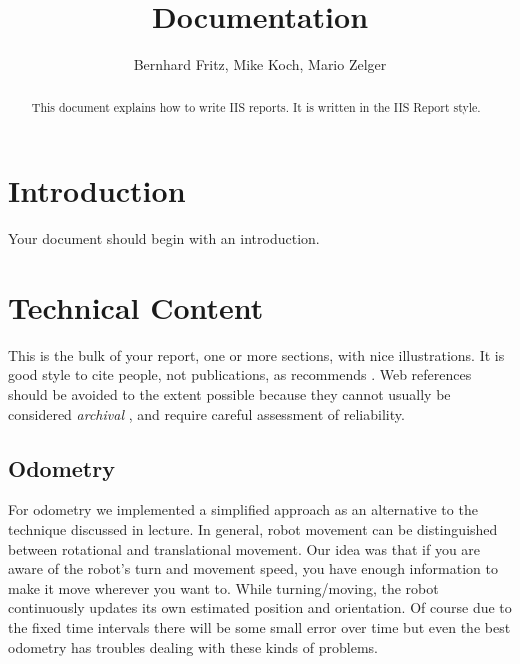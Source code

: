 \documentclass[703030]{iisreport}
\title{Documentation}
\author{Bernhard Fritz, Mike Koch, Mario Zelger}
\begin{document}
\maketitle

\begin{abstract}
  This document explains how to write IIS reports. It is written in the IIS Report style.
\end{abstract}

\section{Introduction}

Your document should begin with an introduction.

\section{Technical Content}

This is the bulk of your report, one or more sections, with nice illustrations. It is good style to cite people, not publications, as recommends \cite{Piater-2011-IISreport}. Web references should be avoided to the extent possible because they cannot usually be considered \emph{archival} \citep{Wikipedia-Archive}, and require careful assessment of reliability.

\subsection{Odometry}
For odometry we implemented a simplified approach as an alternative to the 
technique discussed in lecture. In general, robot movement can be distinguished 
between rotational and translational movement. Our idea was that if you are aware
of the robot's turn and movement speed, you have enough information to make it 
move wherever you want to. While turning/moving, the robot continuously updates its 
own estimated position and orientation. Of course due to the fixed time intervals 
there will be some small error over time but even the best odometry has troubles 
dealing with these kinds of problems.
\end{document}
